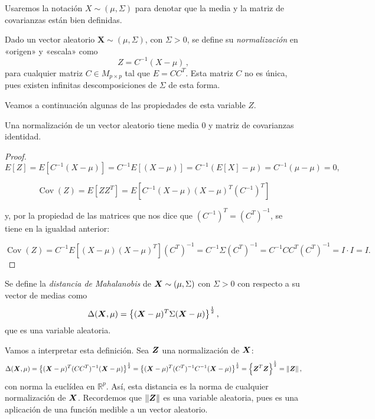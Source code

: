 \begin{nota}
  Usaremos la notación $X\sim(\mu,\Sigma)$ para denotar que la media y la matriz de covarianzas están bien definidas.
\end{nota}

\begin{ndef}[Normalización]
    Dado un vector aleatorio $\boldsymbol X\sim(\mu,\Sigma)$, con $\Sigma>0$, se define su \emph{normalización} en «origen» y «escala» como
    \[
  Z = C^{-1}(X - \mu)\,,
\]
para cualquier matriz $C\in M_{p\times p}$ tal que $E = CC^T$. Esta matriz $C$ no es única, pues existen infinitas descomposiciones de $\Sigma$ de esta forma.

  \end{ndef}

Veamos a continuación algunas de las propiedades de esta variable $Z$.
\begin{nprop}
  Una normalización de un vector aleatorio tiene media $0$ y matriz de covarianzas identidad.
\end{nprop}

\begin{proof} \hfill\\
    \[
    E[Z] = E[C^{-1}(X-\mu)] = C^{-1}E[(X-\mu)] = C^{-1}(E[X] - \mu) = C^{-1}(\mu - \mu ) = 0,
    \]

    \[
    \operatorname{Cov}(Z) = E[ZZ ^T] = E[C^{-1}(X-\mu)(X-\mu)^T(C^{-1})^T]
    \]

    y, por la propiedad de las matrices que nos dice que $(C^{-1})^T = (C^T)^{-1}$, se tiene en la igualdad anterior:

    \[
      \operatorname{Cov}(Z) = C^{-1}E[(X-\mu)(X-\mu)^T](C^T)^{-1} = C^{-1} \Sigma (C^T)^{-1} = C^{-1}CC^T(C^T)^{-1} = I \cdot I = I
    .\]

\end{proof}
  \begin{ndef}
    Se define la \emph{distancia de Mahalanobis} de $\boldsymbol{X}\sim(\mu,\Sigma)$ con $\Sigma > 0$ con respecto a su vector de medias como
    \[
    \Delta(\boldsymbol{X},\mu) = \left\{ (\boldsymbol{X}-\mu)^T \Sigma (\boldsymbol{X}-\mu) \right\} ^{\frac{1}{2}},
    \]
    que es una variable aleatoria.
  \end{ndef}

  Vamos a interpretar esta definición. Sea $\boldsymbol{Z}$ una normalización de $\boldsymbol{X}$:
  \[
  \Delta(\boldsymbol{X},\mu) = \left\{ (\boldsymbol{X}-\mu)^T (CC^T)^{-1}(\boldsymbol{X}-\mu)\right\}^{\frac{1}{2}} = \left\{ (\boldsymbol{X}-\mu)^T (C^T)^{-1}C^{-1}(\boldsymbol{X}-\mu)\right\}^{\frac{1}{2}} = \left\{\boldsymbol{Z}^T \boldsymbol{Z}\right\}^{\frac{1}{2}} = \Vert \boldsymbol{Z}\Vert\,,
  \]
  con norma la euclídea en $\mathbb R^p$. Así, esta distancia es la norma de cualquier normalización de $\boldsymbol{X}$. Recordemos que $\Vert \boldsymbol{Z}\Vert$ es una variable aleatoria, pues es una aplicación de una función medible a un vector aleatorio.

